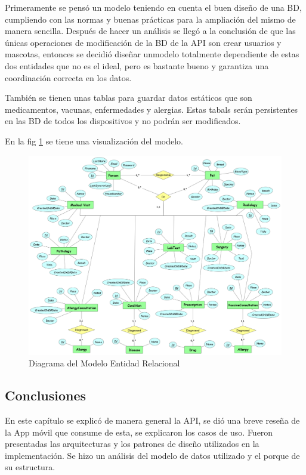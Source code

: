 Primeramente se pensó un modelo teniendo en cuenta el buen diseño de una BD, cumpliendo con las normas y buenas prácticas para la ampliación del mismo de manera sencilla. Después de hacer un análisis se llegó a la conclusión de que las únicas operaciones de modificación de la BD de la API son crear  usuarios y mascotas, entonces se decidió diseñar unmodelo totalmente dependiente de estas dos entidades que no es el ideal, pero es bastante bueno y garantiza una coordinación correcta en los datos. 

También se tienen unas tablas para guardar datos estáticos que son medicamentos, vacunas, enfermedades y alergias. Estas tabals serán persistentes en las BD de todos los dispositivos y no podrán ser modificados. 

En la fig \ref{fig:model} se tiene una visualización del modelo.

\begin{figure}
	\centering
	\includegraphics[width = 15cm]{MainMatter/model.png}
	\caption{Diagrama del Modelo Entidad Relacional }
	\label{fig:model}
	
\end{figure}	

\subsection{Conclusiones}
En este capítulo se explicó de manera general la API, se dió una breve reseña de la App móvil que consume de esta, se explicaron los casos de uso. Fueron presentadas las arquitecturas y los patrones de diseño utilizados en la implementación. Se hizo un análisis del modelo de datos utilizado  y el porque de su estructura.

  

